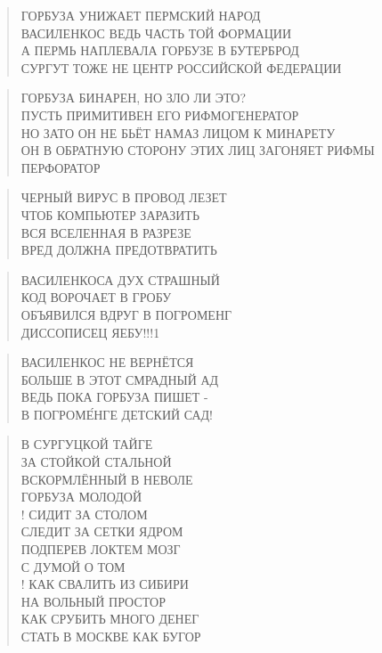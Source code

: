 \poemtitle{***}
\begin{verse}
ГОРБУЗА УНИЖАЕТ ПЕРМСКИЙ НАРОД\\
ВАСИЛЕНКОС ВЕДЬ ЧАСТЬ ТОЙ ФОРМАЦИИ\\
А ПЕРМЬ НАПЛЕВАЛА ГОРБУЗЕ В БУТЕРБРОД\\
СУРГУТ ТОЖЕ НЕ ЦЕНТР РОССИЙСКОЙ ФЕДЕРАЦИИ
\end{verse}

\poemtitle{***}
\begin{verse}
ГОРБУЗА БИНАРЕН, НО ЗЛО ЛИ ЭТО?\\
ПУСТЬ ПРИМИТИВЕН ЕГО РИФМОГЕНЕРАТОР\\
НО ЗАТО ОН НЕ БЬЁТ НАМАЗ ЛИЦОМ К МИНАРЕТУ\\
ОН В ОБРАТНУЮ СТОРОНУ ЭТИХ ЛИЦ ЗАГОНЯЕТ РИФМЫ ПЕРФОРАТОР
\end{verse}

\poemtitle{***}
\begin{verse}
ЧЕРНЫЙ ВИРУС В ПРОВОД ЛЕЗЕТ\\
ЧТОБ КОМПЬЮТЕР ЗАРАЗИТЬ\\
ВСЯ ВСЕЛЕННАЯ В РАЗРЕЗЕ\\
ВРЕД ДОЛЖНА ПРЕДОТВРАТИТЬ
\end{verse}

\poemtitle{***}
\begin{verse}
ВАСИЛЕНКОСА ДУХ СТРАШНЫЙ\\
КОД ВОРОЧАЕТ В ГРОБУ\\
ОБЪЯВИЛСЯ ВДРУГ В ПОГРОМЕНГ\\
ДИССОПИСЕЦ ЯЕБУ!!!1
\end{verse}

\poemtitle{***}
\begin{verse}
ВАСИЛЕНКОС НЕ ВЕРНЁТСЯ\\
БОЛЬШЕ В ЭТОТ СМРАДНЫЙ АД\\
ВЕДЬ ПОКА ГОРБУЗА ПИШЕТ -\\
В ПОГРОМЕ́НГЕ ДЕТСКИЙ САД!
\end{verse}

\poemtitle{***}
\begin{verse}
В СУРГУЦКОЙ ТАЙГЕ\\
ЗА СТОЙКОЙ СТАЛЬНОЙ\\
ВСКОРМЛЁННЫЙ В НЕВОЛЕ\\
ГОРБУЗА МОЛОДОЙ\\!
СИДИТ ЗА СТОЛОМ\\
СЛЕДИТ ЗА СЕТКИ ЯДРОМ\\
ПОДПЕРЕВ ЛОКТЕМ МОЗГ\\
С ДУМОЙ О ТОМ\\!
КАК СВАЛИТЬ ИЗ СИБИРИ\\
НА ВОЛЬНЫЙ ПРОСТОР\\
КАК СРУБИТЬ МНОГО ДЕНЕГ\\
СТАТЬ В МОСКВЕ КАК БУГОР
\end{verse}

